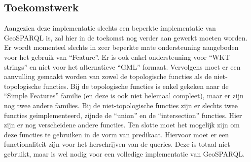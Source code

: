 \subsection{Toekomstwerk}
\label{subsec:toekomstwerk}
Aangezien deze implementatie slechts een beperkte implementatie van GeoSPARQL is, zal hier in de toekomst nog verder aan gewerkt moeten worden. Er wordt momenteel slechts in zeer beperkte mate ondersteuning aangeboden voor het gebruik van ``Feature''. Er is ook enkel ondersteuning voor ``WKT strings'' en niet voor het alternatieve ``GML'' formaat. Vervolgens moet er een aanvulling gemaakt worden van zowel de topologische functies als de niet-topologische functies. Bij de topologische functies is enkel gekeken naar de ``Simple Features'' familie (en deze is ook niet helemaal compleet), maar er zijn nog twee andere families. Bij de niet-topologische functies zijn er slechts twee functies geïmplementeerd, zijnde de ``union'' en de ``intersection'' functies. Hier zijn er nog verscheidene andere functies. Ten slotte moet het mogelijk zijn om deze functies te gebruiken in de vorm van predikaat. Hiervoor moet er een functionaliteit zijn voor het herschrijven van de queries. Deze is totaal niet gebruikt, maar is wel nodig voor een volledige implementatie van GeoSPARQL. 